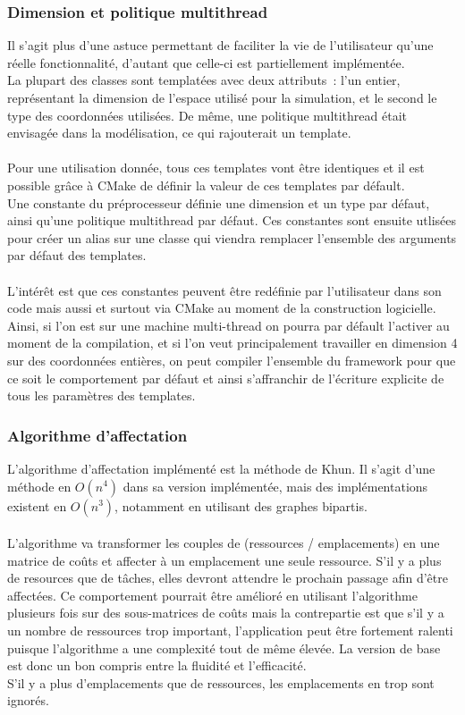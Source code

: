 \subsubsection{Dimension et politique multithread}

Il s'agit plus d'une astuce permettant de faciliter la vie de l'utilisateur qu'une réelle fonctionnalité, d'autant que celle-ci est partiellement implémentée.\\
La plupart des classes sont templatées avec deux attributs~: l'un entier, représentant la dimension de l'espace utilisé pour la simulation, et le second le type des coordonnées utilisées. De même, une politique multithread était envisagée dans la modélisation, ce qui rajouterait un template.\\\\

Pour une utilisation donnée, tous ces templates vont être identiques et il est possible grâce à CMake de définir la valeur de ces templates par défault.\\
Une constante du préprocesseur définie une dimension et un type par défaut, ainsi qu'une politique multithread par défaut. Ces constantes sont ensuite utlisées pour créer un alias sur une classe qui viendra remplacer l'ensemble des arguments par défaut des templates.\\\\

L'intérêt est que ces constantes peuvent être redéfinie par l'utilisateur dans son code mais aussi et surtout via CMake au moment de la construction logicielle. Ainsi, si l'on est sur une machine multi-thread on pourra par défault l'activer au moment de la compilation, et si l'on veut principalement travailler en dimension 4 sur des coordonnées entières, on peut compiler l'ensemble du framework pour que ce soit le comportement par défaut et ainsi s'affranchir de l'écriture explicite de tous les paramètres des templates. 

\subsubsection{Algorithme d'affectation}

L'algorithme d'affectation implémenté est la méthode de Khun. Il s'agit d'une méthode en $O(n^4)$ dans sa version implémentée, mais des implémentations existent en $O(n^3)$, notamment en utilisant des graphes bipartis.\\\\
L'algorithme va transformer les couples de (ressources / emplacements) en une matrice de coûts et affecter à un emplacement une seule ressource. S'il y a plus de resources que de tâches, elles devront attendre le prochain passage afin d'être affectées. Ce comportement pourrait être amélioré en utilisant l'algorithme plusieurs fois sur des sous-matrices de coûts mais la contrepartie est que s'il y a un nombre de ressources trop important, l'application peut être fortement ralenti puisque l'algorithme a une complexité tout de même élevée. La version de base est donc un bon compris entre la fluidité et l'efficacité.\\
S'il y a plus d'emplacements que de ressources, les emplacements en trop sont ignorés.

